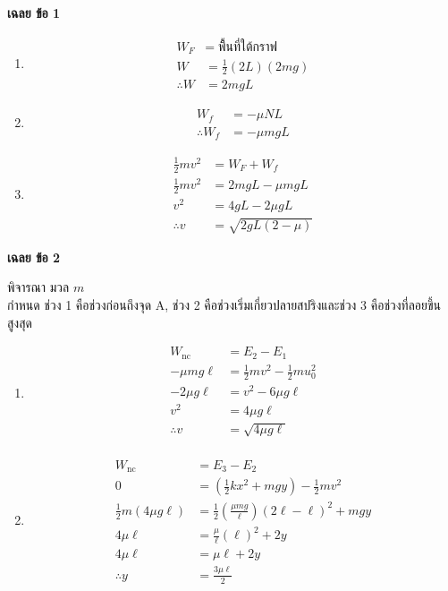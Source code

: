 \documentclass[a4paper,12pt]{article}
\begin{document}
\begin{center}
	\textbf{{\Large เฉลย ข้อ 1}}
\end{center}
\begin{enumerate}
	\item \begin{align*}
		      W_F          & =\;\text{พิื้นที่ใต้กราฟ}   \\
		      W            & =\frac{1}{2}(2L)(2mg) \\
		      \therefore W & =2mgL
	      \end{align*}
	\item \begin{align*}
		      W_f            & =-\mu NL  \\
		      \therefore W_f & =-\mu mgL
	      \end{align*}
	\item \begin{align*}
		      \frac{1}{2}mv^2 & =W_F+W_f           \\
		      \frac{1}{2}mv^2 & =2mgL-\mu mgL      \\
		      v^2             & =4gL-2\mu gL       \\
		      \therefore v    & =\sqrt{2gL(2-\mu)}
	      \end{align*}
\end{enumerate}
\newpage
\begin{center}
	\textbf{{\Large เฉลย ข้อ 2}}\\
\end{center}
พิจารณา มวล \(m\)\\
กำหนด ช่วง 1 คือช่วงก่อนถึงจุด A, ช่วง 2 คือช่วงเริ่มเกี่ยวปลายสปริงและช่วง 3 คือช่วงที่ลอยขึ้นสูงสุด\\
\begin{enumerate}
	\item 
	      \begin{align*}
	      	W_{\text{nc}}&=E_2-E_1\\
		      -\mu mg\ell&=\frac{1}{2}mv^2-\frac{1}{2}mu_0^2 \\
		      -2\mu g\ell&=v^2-6\mu g\ell                    \\
		      v^2&=4\mu g\ell                                \\
		      \therefore v&=\sqrt{4\mu g\ell}                \\
	      \end{align*}
	\item 
	      \begin{align*}
	      	W_{\text{nc}}&=E_3-E_2\\
		      0&=\left( \frac{1}{2}kx^2+mgy\right) -\frac{1}{2}mv^2                                               \\
		      \frac{1}{2}m(4\mu g\ell)
		      &=\frac{1}{2}\left( \frac{\mu mg}{\ell}\right) \left( 2\ell-\ell\right) ^2+mgy \\
		      4\mu \ell&=\frac{\mu}{\ell}\left( \ell\right) ^2+2y                                          \\
		      4\mu \ell&=\mu \ell+2y                                                       \\
		      \therefore y&=\frac{3\mu \ell}{2}
	      \end{align*}
\end{enumerate}
\end{document}
